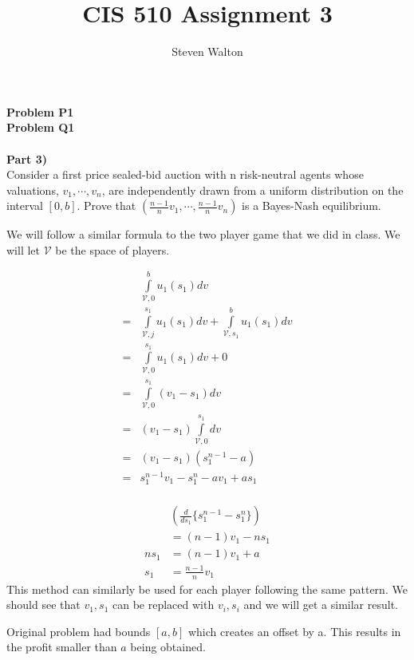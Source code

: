 \documentclass[12pt,letter]{article}
\newcommand{\problem}[1]{\vspace{3mm}\Large\textbf{{Problem {#1}\vspace{3mm}}}\normalsize\\}
\newcommand{\ppart}[1]{\vspace{2mm}\large\textbf{\\Part {#1})\vspace{2mm}}\normalsize\\}
\begin{document}
\title{CIS 510 Assignment 3}
\author{Steven Walton}
\maketitle
\problem{P1}

\problem{Q1}
\ppart{3}
Consider a first price sealed-bid auction with n risk-neutral agents whose 
valuations, $v_1,\cdots,v_n$, are independently drawn from a uniform distribution
on the interval $[0,b]$. Prove that $\left(\frac{n-1}{n}v_1,\cdots,\frac{n-1}{n}v_n\right)$ is a Bayes-Nash equilibrium.

We will follow a similar formula to the two player game that we did in class.
We will let $\mathcal{V}$ be the space of players.

\begin{minipage}{\textwidth}
\begin{multicols}{2}
\begin{align*}
    &\int\limits_{\mathcal{V},0}^b u_1(s_1) dv\\
    =&\int\limits_{\mathcal{V},j}^{s_1} u_1(s_1)dv + \int\limits_{\mathcal{V},s_1}^b u_1(s_1)dv\\
    =&\int\limits_{\mathcal{V},0}^{s_1} u_1(s_1)dv + 0\\
    =&\int\limits_{\mathcal{V},0}^{s_1} (v_1 - s_1)dv\\
    =&(v_1 - s_1) \int\limits_{\mathcal{V},0}^{s_1}dv\\
    =&(v_1 - s_1)(s_1^{n-1} - a)\\
    =&s_1^{n-1}v_1 - s_1^{n} -av_1 + as_1\\
\end{align*}

\begin{align*}
    &\left(\frac{d}{ds_1}\{s_1^{n-1}-s_1^{n}\}\right)\\
    &= (n-1)v_1 - ns_1\\
    ns_1 &= (n-1)v_1 +a \\
    s_1 &= \frac{n-1}{n}v_1
\end{align*}
This method can similarly be used for each player following the same pattern.
We should see that $v_1,s_1$ can be replaced with $v_i,s_i$ and we will get
a similar result.

Original problem had bounds $[a,b]$ which creates an offset by a. This results
in the profit smaller than $a$ being obtained. 
\end{multicols}
\end{minipage}
\end{document}

